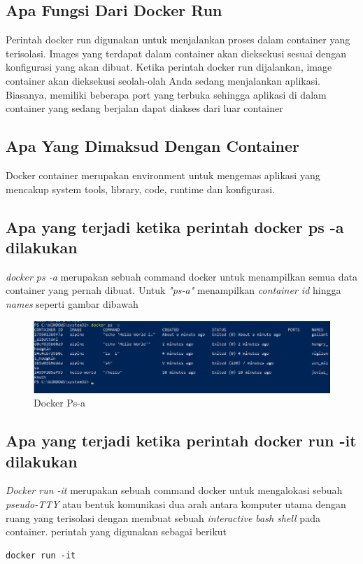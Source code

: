 \documentclass[11pt,a4paper]{article}
\begin{document}
\subsection{Apa Fungsi Dari Docker Run}
Perintah docker run digunakan untuk menjalankan proses dalam container yang terisolasi. Images yang terdapat dalam container akan dieksekusi sesuai dengan konfigurasi yang akan dibuat. Ketika perintah docker run dijalankan, image container akan dieksekusi seolah-olah Anda sedang menjalankan  aplikasi. Biasanya, memiliki beberapa port yang terbuka sehingga aplikasi  di dalam container yang sedang berjalan dapat  diakses dari luar container 

\subsection{Apa Yang Dimaksud Dengan Container}
Docker container merupakan environment untuk mengemas aplikasi yang mencakup system tools, library, code, runtime dan konfigurasi.

\subsection{Apa yang terjadi ketika perintah docker ps -a dilakukan}
\textit{docker ps -a} merupakan sebuah command docker untuk menampilkan semua data container yang pernah dibuat. Untuk \textit{"ps-a"} menampilkan \textit{container id} hingga \textit{names} seperti gambar dibawah
\begin{figure}
    \centering
    \includegraphics[width=1\textwidth]{Figure/11. perintah yang dah pernah.png}
    \caption{Docker Ps-a}
\end{figure}

\subsection{Apa yang terjadi ketika perintah docker run -it dilakukan}
\textit{Docker run -it} merupakan sebuah command docker untuk mengalokasi sebuah \textit{pseudo-TTY} atau bentuk komunikasi dua arah antara komputer utama dengan ruang yang terisolasi dengan membuat sebuah \textit{interactive bash shell} pada container. perintah yang digunakan sebagai berikut
\begin{lstlisting}
docker run -it\end{lstlisting} 
\end{document}
